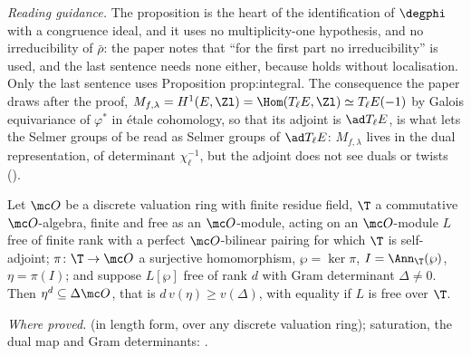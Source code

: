 \begin{sloppypar}
\noindent\emph{Reading guidance.} The proposition is the heart of the identification of $\degphi$ with a congruence ideal, and it uses no multiplicity-one
hypothesis, and no irreducibility of $\bar\rho$: the paper notes that ``for the first part no irreducibility'' is used, and the last sentence needs none either,
because  holds without localisation. Only the last sentence uses Proposition prop:integral. The consequence the paper draws after the proof,
$M_{f,\lambda}=H^1(E,\Zl)=\Hom(T_\ell E,\Zl)\simeq T_\ell E(-1)$ by Galois equivariance of $\varphi^*$ in \'etale cohomology, so that its adjoint is $\ad T_\ell E$, is what lets
the Selmer groups of \cite{DFG04} be read as Selmer groups of $\ad T_\ell E$: $M_{f,\lambda}$ lives in the dual representation, of determinant $\chi_\ell^{-1}$, but the adjoint
does not see duals or twists ().

\begin{lemma}\label{lem:paper:ddt417}
Let $\mc O$ be a discrete valuation ring with finite residue field, $\T$ a commutative $\mc O$-algebra, finite and free as an $\mc O$-module, acting on an $\mc O$-module $L$ free of finite rank
with a perfect $\mc O$-bilinear pairing for which $\T$ is self-adjoint; $\pi\colon\T\to\mc O$ a surjective homomorphism, $\wp=\ker\pi$, $I=\Ann_\T(\wp)$, $\eta=\pi(I)$; and suppose $L[\wp]$ free of rank $d$
with Gram determinant $\Delta\ne0$. Then $\eta^d\subseteq\Delta\mc O$, that is $d\,v(\eta)\ge v(\Delta)$, with equality if $L$ is free over $\T$.
\end{lemma}

\noindent\emph{Where proved.}  (in length form, over any discrete valuation ring); saturation, the dual map and Gram determinants: .


\end{sloppypar}
